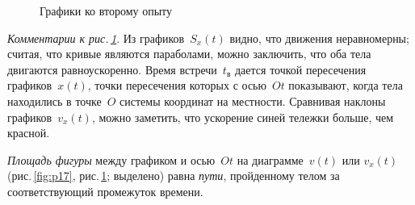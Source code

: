 \documentclass[main.tex]{subfiles}
\begin{document}
\begin{figure}[H]
\caption{Графики ко второму опыту}
\label{fig:p18}
\end{figure}


%     



\noindent\emph{Комментарии к рис.\,\ref{fig:p18}}. Из графиков~$S_x(t)$ видно, что движения неравномерны; считая, что кривые являются параболами, можно заключить, что оба тела двигаются равноускоренно. Время встречи~$t_\text{в}$ дается точкой пересечения графиков~$x(t)$, точки пересечения которых с осью~$Ot$ показывают, когда тела находились в точке~$O$ системы координат на местности. Сравнивая наклоны графиков~$v_x(t)$, можно заметить, что ускорение синей тележки больше, чем красной.

\medskip

\emph{Площадь фигуры} между графиком и осью~$Ot$ на диаграмме~$v(t)$ или $v_x(t)$ (рис.\,\ref{fig:p17}, рис.\,\ref{fig:p18}; выделено) равна \emph{пути}, пройденному телом за соответствующий промежуток времени. 









 
\end{document}
